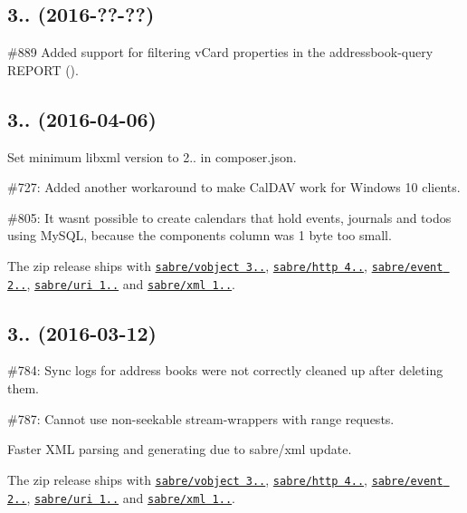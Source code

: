\subsection*{3.. (2016-\/??-\/??) }


\begin{DoxyItemize}
\item \#889 Added support for filtering v\+Card properties in the addressbook-\/query R\+E\+P\+O\+RT ().
\end{DoxyItemize}

\subsection*{3.. (2016-\/04-\/06) }


\begin{DoxyItemize}
\item Set minimum libxml version to 2.. in {\ttfamily composer.\+json}.
\item \#727\+: Added another workaround to make Cal\+D\+AV work for Windows 10 clients.
\item \#805\+: It wasn\textquotesingle{}t possible to create calendars that hold events, journals and todos using My\+S\+QL, because the {\ttfamily components} column was 1 byte too small.
\item The zip release ships with \href{http://sabre.io/vobject/}{\tt sabre/vobject 3..}, \href{http://sabre.io/http/}{\tt sabre/http 4..}, \href{http://sabre.io/event/}{\tt sabre/event 2..}, \href{http://sabre.io/uri/}{\tt sabre/uri 1..} and \href{http://sabre.io/xml/}{\tt sabre/xml 1..}.
\end{DoxyItemize}

\subsection*{3.. (2016-\/03-\/12) }


\begin{DoxyItemize}
\item \#784\+: Sync logs for address books were not correctly cleaned up after deleting them.
\item \#787\+: Cannot use non-\/seekable stream-\/wrappers with range requests.
\item Faster X\+ML parsing and generating due to sabre/xml update.
\item The zip release ships with \href{http://sabre.io/vobject/}{\tt sabre/vobject 3..}, \href{http://sabre.io/http/}{\tt sabre/http 4..}, \href{http://sabre.io/event/}{\tt sabre/event 2..}, \href{http://sabre.io/uri/}{\tt sabre/uri 1..} and \href{http://sabre.io/xml/}{\tt sabre/xml 1..}.
\end{DoxyItemize}

